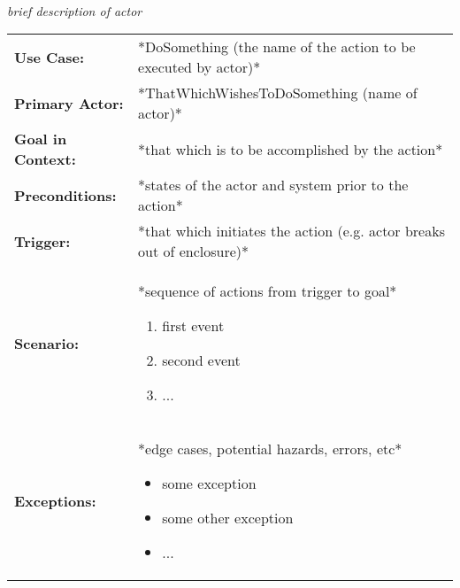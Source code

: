 \documentclass[12pt]{article}
\begin{document}
    \paragraph{} \textit{brief description of actor}
    \begin{table}[H]
    \begin{tabular}{lp{9.9cm}}
        \hline
        \textbf{Use Case:}                     & *DoSomething (the name of the action to be executed by actor)* \\

        \textbf{Primary Actor:}                & *ThatWhichWishesToDoSomething (name of actor)*\\

        \textbf{Goal in Context:}              & *that which is to be accomplished by the action* \\

        \textbf{Preconditions:}                & *states of the actor and system prior to the action* \\

        \textbf{Trigger:}                      & *that which initiates the action (e.g. actor breaks out of enclosure)*\\

        \textbf{Scenario:}                     & *sequence of actions from trigger to goal*
                                                 \begin{enumerate}
                                                     \item first event
                                                     \item second event
                                                     \item ...
                                                 \end{enumerate} \\

        \textbf{Exceptions:}                   & *edge cases, potential hazards, errors, etc*
                                                 \begin{itemize}
                                                     \item[] some exception
                                                     \item[] some other exception
                                                     \item[] ...
                                                 \end{itemize}\\


\end{tabular}
\end{table}
\end{document}
